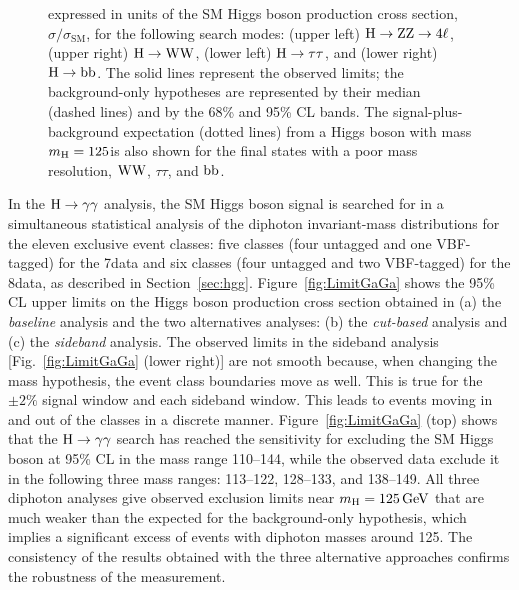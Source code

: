 \documentclass[12pt,twoside,a4paper,cmspaper,final,collab]{cms-tdr}
\begin{document}
\begin{figure}[htbp]
\begin{center}
{expressed in units of the SM Higgs boson production cross section,
$\sigma / \sigma_\text{SM}$,
for the following search modes:
     (upper left) $\mathrm{H} \to \mathrm{Z}\mathrm{Z} \to 4\ell$,
     (upper right) $\mathrm{H} \to \mathrm{W}\mathrm{W}$,
     (lower left) $\mathrm{H} \to \tau\tau$, and
     (lower right) $\mathrm{H} \to \mathrm{b}\mathrm{b}$.
     The solid lines represent the observed limits;
     the background-only hypotheses are represented by their median
 (dashed lines) and by the 68\% and 95\% CL bands.
     The signal-plus-background expectation (dotted lines) from a Higgs boson
     with mass $m_{\mathrm{H}} = 125$\GeV is also shown for the final states
     with a poor mass resolution, $\mathrm{W}\mathrm{W}$, $\tau\tau$, and $\mathrm{b}\mathrm{b}$.
     }
      \label{fig:Limit}
    \end{center}
\end{figure}



In the $\mathrm{H} \to \gamma\gamma$ analysis,
the SM Higgs boson signal is searched for in a simultaneous statistical analysis of the diphoton
invariant-mass distributions for the eleven exclusive event classes:
five classes (four untagged and one VBF-tagged) for the 7\TeV data and
six classes (four untagged and two VBF-tagged) for the 8\TeV data, as described in Section~\ref{sec:hgg}.
Figure~\ref{fig:LimitGaGa} shows the 95\% CL upper limits on
the Higgs boson production cross section obtained in
(a) the \emph{baseline} analysis and the two alternatives analyses:
(b) the \emph{cut-based} analysis and
(c) the \emph{sideband} analysis.
The observed limits in the sideband analysis [Fig.~\ref{fig:LimitGaGa} (lower right)]
are not smooth because, when changing the mass hypothesis, the event class boundaries move as well.
This is true for the ${\pm}2\%$ signal window and each sideband window.
This leads to events moving in and out of the classes in a discrete manner.
Figure~\ref{fig:LimitGaGa} (top) shows that the $\mathrm{H} \to \gamma\gamma$ search has reached
the sensitivity for excluding the SM Higgs boson at 95\% CL
in the mass range 110--144\GeV,
while the observed data exclude it in the following three mass ranges:
113--122\GeV, 128--133\GeV, and 138--149\GeV.
All three diphoton analyses give observed exclusion limits near $m_{\mathrm{H}}=125\,\text{Ge\hspace{-.08em}V}$
that are much weaker than the expected for the background-only hypothesis,
which implies a significant excess of events with diphoton masses around 125\GeV.
The consistency of the results obtained with the three alternative approaches
confirms
the robustness of the measurement.
\end{document}
